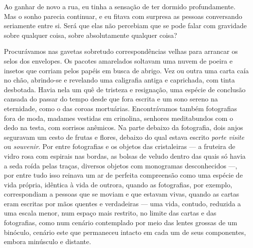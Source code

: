 Ao ganhar de novo a rua, eu tinha a sensação de ter dormido profundamente. Mas
o sonho parecia continuar, e eu fitava com surpresa as pessoas conversando
seriamente entre si. Será que elas não percebiam que se pode falar com
gravidade sobre qualquer coisa, sobre absolutamente qualquer coisa?




Procurávamos nas gavetas sobretudo correspondências velhas para arrancar os
selos dos envelopes. Os pacotes amarelados soltavam uma nuvem de poeira e
insetos que corriam pelos papéis em busca de abrigo. Vez ou outra uma carta
caía no chão, abrindo-se e revelando uma caligrafia antiga e caprichada, com
tinta desbotada. Havia nela um quê de tristeza e resignação, uma espécie de
conclusão cansada do passar do tempo desde que fora escrita e um sono sereno
na eternidade, como o das coroas mortuárias. Encontrávamos também fotografias
fora de moda, madames vestidas em crinolina, senhores meditabundos com o dedo
na testa, com sorrisos anêmicos. Na parte debaixo da fotografia, dois anjos
seguravam um cesto de frutas e flores, debaixo do qual estava escrito \emph
{porte visite} ou \emph{souvenir}. Por entre fotografias e os objetos das
cristaleiras --- a fruteira de vidro rosa com espirais nas bordas, as bolsas
de veludo dentro das quais só havia a seda roída pelas traças, diversos
objetos com monogramas desconhecidos ---, por entre tudo isso reinava um ar
de perfeita compreensão como uma espécie de vida própria, idêntica à vida de
outrora, quando as fotografias, por exemplo, correspondiam a pessoas que se
moviam e que estavam vivas, quando as cartas eram escritas por mãos quentes e
verdadeiras --- uma vida, contudo, reduzida a uma escala menor, num espaço
mais restrito, no limite das cartas e das fotografias, como num cenário
contemplado por meio das lentes grossas de um binóculo, cenário este que
permaneceu intacto em cada um de seus componentes, embora minúsculo e
distante.

